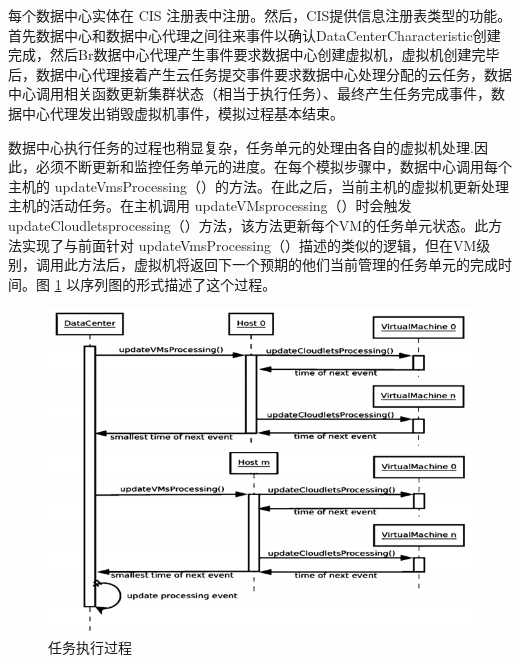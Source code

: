 每个数据中心实体在 CIS 注册表中注册。然后，CIS提供信息注册表类型的功能。首先数据中心和数据中心代理之间往来事件以确认DataCenterCharacteristic创建完成，然后Br数据中心代理产生事件要求数据中心创建虚拟机，虚拟机创建完毕后，数据中心代理接着产生云任务提交事件要求数据中心处理分配的云任务，数据中心调用相关函数更新集群状态（相当于执行任务）、最终产生任务完成事件，数据中心代理发出销毁虚拟机事件，模拟过程基本结束。

数据中心执行任务的过程也稍显复杂，任务单元的处理由各自的虚拟机处理.因此，必须不断更新和监控任务单元的进度。在每个模拟步骤中，数据中心调用每个主机的 updateVmsProcessing（）的方法。在此之后，当前主机的虚拟机更新处理主机的活动任务。在主机调用 updateVMsprocessing（）时会触发 updateCloudletsprocessing（）方法，该方法更新每个VM的任务单元状态。此方法实现了与前面针对 updateVmsProcessing（）描述的类似的逻辑，但在VM级别，调用此方法后，虚拟机将返回下一个预期的他们当前管理的任务单元的完成时间。图 \ref{Fig:chap4_3} 以序列图的形式描述了这个过程。

\begin{figure}[htb]
  \centering
  \includegraphics{./Figure/IMG_Chap4_3.png}
  \caption{任务执行过程}\label{Fig:chap4_3}
\end{figure}

